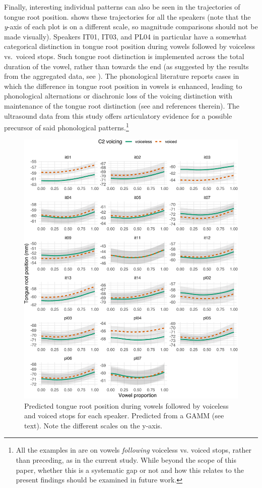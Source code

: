 \documentclass[preprint]{JASAnew}
\begin{document}
Finally, interesting individual patterns can also be seen in the
trajectories of tongue root position.  shows these
trajectories for all the speakers (note that the \emph{y}-axis of each
plot is on a different scale, so magnitude comparisons should not be
made visually). Speakers IT01, IT03, and PL04 in particular have a
somewhat categorical distinction in tongue root position during vowels
followed by voiceless vs.~voiced stops. Such tongue root distinction is
implemented across the total duration of the vowel, rather than towards
the end (as suggested by the results from the aggregated data, see
). The phonological literature reports cases in which the
difference in tongue root position in vowels is enhanced, leading to
phonological alternations or diachronic loss of the voicing distinction
with maintenance of the tongue root distinction (see \citealt{vaux1996}
and references therein). The ultrasound data from this study offers
articulatory evidence for a possible precursor of said phonological
patterns.\footnote{All the examples in \citet{vaux1996} are on vowels \textit{following} voiceless vs. voiced stops, rather than preceding, as in the current study. While beyond the scope of this paper, whether this is a systematic gap or not and how this relates to the present findings should be examined in future work.}

\begin{figure}
\includegraphics[width=\linewidth]{./Figure9} \caption{Predicted tongue root position during vowels followed by voiceless and voiced stops for each speaker. Predicted from a GAMM (see text). Note the different scales on the y-axis.}\label{f:Figure9}
\end{figure}
\end{document}
